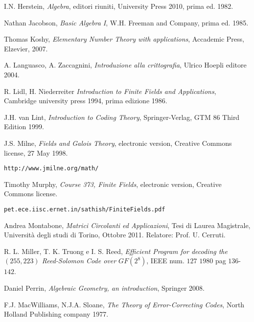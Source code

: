 \begin{thebibliography}{25}





I.N. Herstein, \emph{Algebra},
editori riuniti, University Press 2010, prima ed. 1982.

Nathan Jacobson, \emph{Basic Algebra I}, W.H. Freeman and Company, prima ed. 1985.

Thomas Koshy, \emph{Elementary Number Theory with applications}, Accademic Press, Elzevier, 2007.

A. Languasco, A. Zaccagnini, \emph{Introduzione alla crittografia}, Ulrico Hoepli editore 2004.

R. Lidl, H. Niederreiter \emph{Introduction to Finite Fields and Applications},
Cambridge university press 1994, prima edizione 1986.

J.H. van Lint, \emph{Introduction to Coding Theory},
Springer-Verlag, GTM 86 Third Edition 1999.

J.S. Milne, \emph{Fields and Galois Theory}, electronic version,
Creative
Commons license, 27 May 1998.
\begin{verbatim}
http://www.jmilne.org/math/
\end{verbatim}

Timothy Murphy, \emph{Course 373, Finite Fields}, electronic version, Creative Commons license.
\begin{verbatim}
pet.ece.iisc.ernet.in/sathish/FiniteFields.pdf 
\end{verbatim}

Andrea Montabone, \emph{Matrici Circolanti ed Applicazioni},
Tesi di Laurea Magistrale, Università degli studi di Torino, Ottobre 2011.
Relatore: Prof. U. Cerruti.

R. L. Miller, T. K. Truong e I. S. Reed, \emph{Efficient Program for decoding the $(255,223)$ Reed-Solomon Code over $GF(2^{8})$}, IEEE num. $127$ $1980$ pag $136$-$142$. 

Daniel Perrin, \emph{Algebraic Geometry, an introduction}, Springer 2008.

F.J. MacWilliams, N.J.A. Sloane, \emph{The Theory of Error-Correcting Codes},
North Holland Publishing company 1977.


\end{thebibliography}
